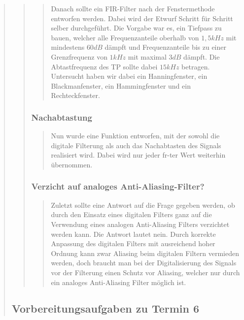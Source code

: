 \begin{quote}
\begin{quote}
\begin{quote}
		    Danach sollte ein FIR-Filter nach der Fenstermethode entworfen werden. Dabei
		    wird der Etwurf Schritt für Schritt selber durchgeführt. Die Vorgabe war es,
		    ein Tiefpass zu bauen, welcher alle Frequenzanteile oberhalb von $1,5 kHz$
		    mit mindestens $60 dB$ dämpft und Frequenzanteile bis zu einer Grenzfrequenz
		    von $1 kHz$ mit maximal $3 dB$ dämpft. Die Abtastfrequenz des TP sollte
		    dabei $15 kHz$ betragen. Untersucht haben wir dabei ein Hanningfenster, ein
		    Blackmanfenster, ein Hammingfenster und ein Rechteckfenster.
		    
		            
		            
		  \end{quote}          
		            
		  \subsubsection{Nachabtastung}
		  \begin{quote}
		            
		    Nun wurde eine Funktion entworfen, mit der sowohl die digitale Filterung als
		    auch das Nachabtasten des Signals realisiert wird. Dabei wird nur jeder
		    fr-ter Wert weiterhin übernommen.  
		 
		  \end{quote}
		  
		  \subsubsection{Verzicht auf analoges Anti-Aliasing-Filter?}
		  \begin{quote}
		  
		  Zuletzt sollte eine Antwort auf die Frage gegeben werden, ob durch den
		  Einsatz eines digitalen Filters ganz auf die Verwendung eines analogen
		  Anti-Aliasing Filters verzichtet werden kann. Die Antwort lautet nein. Durch
		  korrekte Anpassung des digitalen Filters mit ausreichend hoher Ordnung kann zwar 
		  Aliasing beim digitalen Filtern vermieden werden, doch braucht man bei der
		  Digitalisierung des Signals vor der Filterung einen Schutz vor Aliasing,
		  welcher nur durch ein analoges Anti-Aliasing Filter möglich ist.
		  
		  \end{quote}
	
	\end{quote}
	
	
    \subsection{Vorbereitungsaufgaben zu Termin 6}
    \begin{quote}
    	

\end{quote}
\end{quote}
